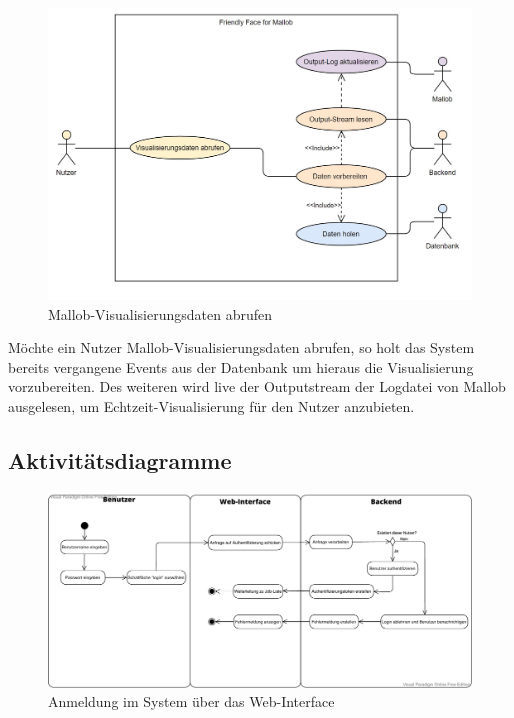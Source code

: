 \begin{figure}[H]
    \centering
    \includegraphics[width=\textwidth]{images-interface/Diagramme/visualisierungsdaten_anwendungsfaelle.jpg}
    \caption{Mallob-Visualisierungsdaten abrufen}
\end{figure}
Möchte ein Nutzer Mallob-Visualisierungsdaten abrufen, so holt das System bereits vergangene Events aus der Datenbank um hieraus die Visualisierung vorzubereiten. Des weiteren wird live der Outputstream der Logdatei von Mallob ausgelesen, um Echtzeit-Visualisierung für den Nutzer anzubieten. 


\pagebreak

\subsection{Aktivitätsdiagramme}
\begin{figure}[H]
    \centering
    \includegraphics[width=\textwidth]{images-interface/Anmelden_Aktivitaetsdiagramm.pdf}
    \caption{Anmeldung im System über das Web-Interface}
    \label{fig:login_activity}
    
\end{figure}

